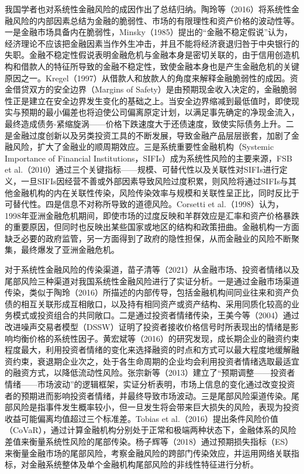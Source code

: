\documentclass[lang=cn]{elegantpaper}
\begin{document}
我国学者也对系统性金融风险的成因作出了总结归纳。陶玲等（2016）\cite{01}将系统性金融风险的内部因素总结为金融的脆弱性、市场的有限理性和资产价格的波动性等。一是金融市场具备内在脆弱性，Minsky（1985）\cite{02}提出的“金融不稳定假说”认为，经济理论不应该把金融因素当作外生冲击，并且不能将经济衰退归咎于中央银行的失职。金融不稳定性假说表明金融危机与金融本身是密切关联的，由于信用创造机构和借款人的特征所导致的金融不稳定性，致使金融本身也是产生金融危机的关键原因之一。Kregel（1997）\cite{03}从借款人和放款人的角度来解释金融脆弱性的成因。资金借贷双方的安全边界（Margins of Safety）是由预期现金收入决定的，金融脆弱性正是建立在安全边界发生变化的基础之上。当安全边界缩减到最低值时，即使现实与预期的最小偏差也将迫使公司偏离原定计划，以满足事先确定的净现金流入，最终造成债务-紧缩旋涡——价格下跌速度大于还债速度，致使实际债务上升。二是金融过度创新以及另类投资工具的不断发展，导致金融产品层层嵌套，加剧了金融风险，扩大了金融业的顺周期效应。三是系统重要性金融机构（Systemic Importance of Financial Institutions，SIFIs）成为系统性风险的主要来源，FSB et al.（2010）\cite{04}通过三个关键指标——规模、可替代性以及关联性对SIFIs进行定义，一旦SIFIs因经营不善或外部因素导致风险过度积累，则风险将通过SIFIs与其他金融机构的内在关联性传染，风险传染效率与规模和关联性呈正比，同时反比于可替代性。四是信息不对称所导致的道德风险。Corsetti et al.（1998）\cite{05}认为，1998年亚洲金融危机期间，即使市场的过度反映和羊群效应是汇率和资产价格暴跌的重要原因，但同时也反映出某些国家或地区的结构和政策扭曲。金融机构一方面缺乏必要的政府监管，另一方面得到了政府的隐性担保，从而金融业的风险不断聚集，最终爆发了亚洲金融危机。


对于系统性金融风险的传染渠道，苗子清等（2021）\cite{06}从金融市场、投资者情绪以及尾部风险三种渠道对我国系统性金融风险进行了实证分析。一是通过金融市场渠道传染，类似于陶玲（2016）\cite{01}所描述的内部传导，包括金融机构间同业往来和资产负债的相互关联形成互相敞口，以及持有相同资产或资产结构、采用同质化较高的业务模式或投资组合的共同敞口。二是通过投资者情绪传染，王美今等（2004）\cite{07}通过改进噪声交易者模型（DSSW）证明了投资者接收价格信号时所表现出的情绪是影响均衡价格的系统性因子。黄宏斌等（2016）\cite{08}的研究发现，成长期企业的融资约束程度最大，利用投资者情绪的变化来选择融资的时点和方式可以最大程度地缓解融资约束，衰退期企业次之，处于各生命周期的企业均会利用投资者情绪选取最适宜的融资方式，以降低流动性风险。张宗新等（2013）\cite{09}建立了“预期调整——投资者情绪——市场波动”的逻辑框架，实证分析表明，市场上信息的变化通过改变投资者的预期进而影响投资者情绪，并最终导致市场波动。三是尾部风险渠道传染。尾部风险是指事件发生概率较小，但一旦发生将会带来巨大损失的风险，表现为投资收益可能偏离均值超过三个标准差。Tobias et al.（2016）\cite{10}提出条件风险价值（CoVaR），通过计算金融机构分别处于正常和极端两种状态下，金融体系的风险差值来衡量系统性风险的尾部传染。杨子辉等（2018）\cite{11}通过预期损失指标（ES）来衡量金融市场的尾部风险，考察金融风险的跨部门传染效应，并运用网络关联指标，对金融系统整体及单个金融机构尾部风险的非线性特征进行分析。
\end{document}
